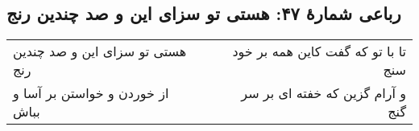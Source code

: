 \begin{center}
\section*{رباعی شمارهٔ ۴۷: هستی تو سزای این و صد چندین رنج}
\label{sec:047}
\begin{longtable}{l p{0.5cm} r}
هستی تو سزای این و صد چندین رنج
&&
تا با تو که گفت کاین همه بر خود سنج
\\
از خوردن و خواستن بر آسا و بباش
&&
و آرام گزین که خفته ای بر سر گنج
\\
\end{longtable}
\end{center}
